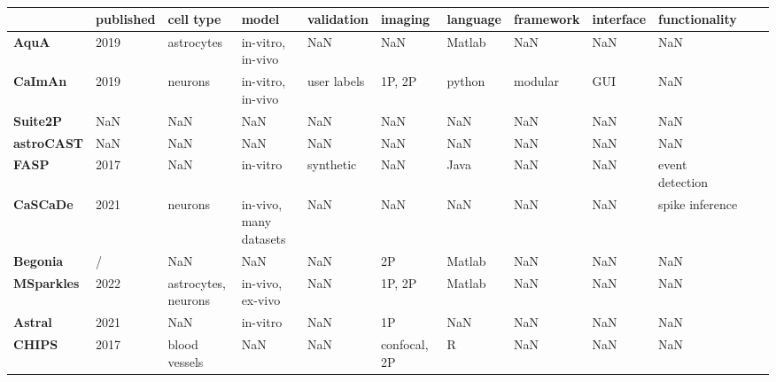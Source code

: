 \bgroup
\def\arraystretch{1.3}
\begin{table}[htb]
    \centering
    \caption{\newline}
    \label{tab:transposed-comparison}
    \begin{tabular}{|l|l|l|l|l|l|l|l|l|l|l|l|}
    \hline {} & \textbf{published} & \textbf{cell type} & \textbf{model} & \textbf{validation} & \textbf{imaging} & \textbf{language} & \textbf{framework} & \textbf{interface} & \textbf{functionality} \\
    \hline \textbf{AquA} & 2019 & astrocytes & \makecell{in-vitro,\\in-vivo} & NaN & NaN & Matlab & NaN & NaN & NaN \\
    \hline \textbf{CaImAn} & 2019 & neurons & \makecell{in-vitro,\\in-vivo} & user labels & 1P, 2P & python & modular & GUI & NaN \\
    \hline \textbf{Suite2P} & NaN & NaN & NaN & NaN & NaN & NaN & NaN & NaN & NaN \\
    \hline \textbf{astroCAST} & NaN & NaN & NaN & NaN & NaN & NaN & NaN & NaN & NaN \\
    \hline \textbf{FASP} & 2017 & NaN & in-vitro & synthetic & NaN & Java & NaN & NaN & event detection \\
    \hline \textbf{CaSCaDe} & 2021 & neurons & \makecell{in-vivo,\\many datasets} & NaN & NaN & NaN & NaN & NaN & spike inference \\
    \hline \textbf{Begonia} & / & NaN & NaN & NaN & 2P & Matlab & NaN & NaN & NaN \\
    \hline \textbf{MSparkles} & 2022 & \makecell{astrocytes,\\neurons} & \makecell{in-vivo,\\ex-vivo} & NaN & 1P, 2P & Matlab & NaN & NaN & NaN \\
    \hline \textbf{Astral} & 2021 & NaN & in-vitro & NaN & 1P & NaN & NaN & NaN & NaN \\
    \hline \textbf{CHIPS} & 2017 & blood vessels & NaN & NaN & confocal, 2P & R & NaN & NaN & NaN \\
    \hline
    \end{tabular}
\end{table}
\egroup


